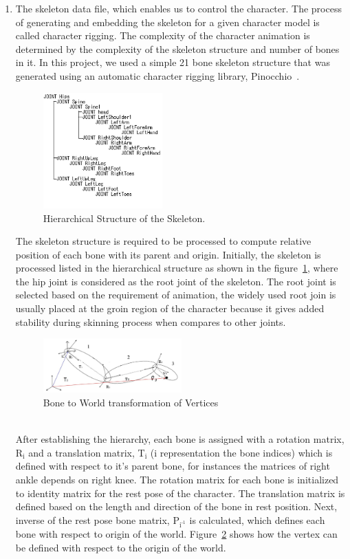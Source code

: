 \documentclass[annual]{styles/acmsiggraph}
\begin{document}
\begin{enumerate}
\item The skeleton data file, which enables us to control the character. The process of generating and embedding the skeleton for a given character model is called character rigging. The complexity of the character animation is determined by the complexity of the skeleton structure and number of bones in it. In this project, we used a simple 21 bone skeleton structure that was generated using an automatic character rigging library, Pinocchio~\cite{Baran:2007:ARA:1275808.1276467}. 
\begin{figure}[ht]
  \centering
  \includegraphics[width=1.8in]{images/ske2}
  \caption{Hierarchical Structure of the Skeleton.}
  \label{hier}
\end{figure}
The skeleton structure is required to be processed to compute relative position of each bone with its parent and origin. Initially, the skeleton is processed listed in the hierarchical structure as shown in the figure~\ref{hier}, where the hip joint is considered as the root joint of the skeleton. The root joint is selected based on the requirement of animation, the widely used root join is usually placed at the groin region of the character because it gives added stability during skinning process when compares to other joints. 
\begin{figure}[ht]
  \centering
  \includegraphics[width=2.1in]{images/skelet}
  \caption{Bone to World transformation of Vertices}
  \label{bw}
\end{figure} \\
After establishing the hierarchy, each bone is assigned with a rotation matrix, R$_{\text{i}}$ and a translation matrix, T$_{\text{i}}$ (i representation the bone indices) which is defined with respect to it’s parent bone, for instances the matrices of right ankle depends on right knee. The rotation matrix for each bone is initialized to identity matrix for the rest pose of the character. The translation matrix is defined based on the length and direction of the bone in rest position. Next, inverse of the rest pose bone matrix, P$_{\text{i}^{\text{-1}}}$ is calculated, which defines each bone with respect to origin of the world. Figure~\ref{bw} shows how the vertex can be defined with respect to the origin of the world.


\end{enumerate}
\end{document}
